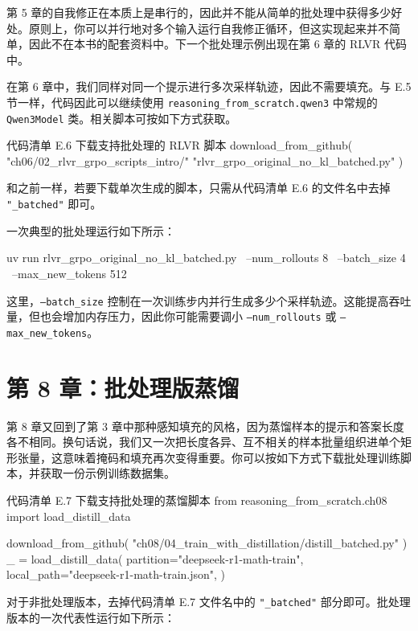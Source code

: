 第 5 章的自我修正在本质上是串行的，因此并不能从简单的批处理中获得多少好处。原则上，你可以并行地对多个输入运行自我修正循环，但这实现起来并不简单，因此不在本书的配套资料中。下一个批处理示例出现在第 6 章的 RLVR 代码中。

在第 6 章中，我们同样对同一个提示进行多次采样轨迹，因此不需要填充。与 E.5 节一样，代码因此可以继续使用 \texttt{reasoning\_from\_scratch.qwen3} 中常规的 \texttt{Qwen3Model} 类。相关脚本可按如下方式获取。

\begin{codeboxt}{代码清单 E.6 下载支持批处理的 RLVR 脚本}
download_from_github(
    "ch06/02_rlvr_grpo_scripts_intro/"
    "rlvr_grpo_original_no_kl_batched.py"
)
\end{codeboxt}

和之前一样，若要下载单次生成的脚本，只需从代码清单 E.6 的文件名中去掉 \texttt{"}\texttt{\_batched}\texttt{"} 即可。

一次典型的批处理运行如下所示：

\begin{codebox}
uv run rlvr_grpo_original_no_kl_batched.py \
  --num_rollouts 8 \
  --batch_size 4 \
  --max_new_tokens 512
\end{codebox}

这里，\texttt{--batch\_size} 控制在一次训练步内并行生成多少个采样轨迹。这能提高吞吐量，但也会增加内存压力，因此你可能需要调小 \texttt{--num\_rollouts} 或 \texttt{--max\_new\_tokens}。

\section{第 8 章：批处理版蒸馏}

第 8 章又回到了第 3 章中那种感知填充的风格，因为蒸馏样本的提示和答案长度各不相同。换句话说，我们又一次把长度各异、互不相关的样本批量组织进单个矩形张量，这意味着掩码和填充再次变得重要。你可以按如下方式下载批处理训练脚本，并获取一份示例训练数据集。

\begin{codeboxt}{代码清单 E.7 下载支持批处理的蒸馏脚本}
from reasoning_from_scratch.ch08 import load_distill_data

download_from_github(
    "ch08/04_train_with_distillation/distill_batched.py"
)
_ = load_distill_data(
    partition="deepseek-r1-math-train",
    local_path="deepseek-r1-math-train.json",
)
\end{codeboxt}

对于非批处理版本，去掉代码清单 E.7 文件名中的 \texttt{"}\texttt{\_batched}\texttt{"} 部分即可。批处理版本的一次代表性运行如下所示：

